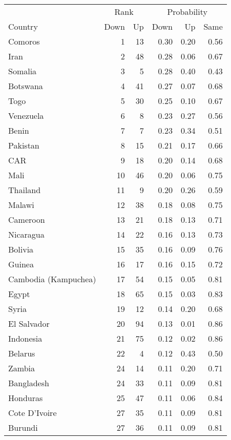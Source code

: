 
\begin{longtable}[t]{lrrrrr}
\toprule
\multicolumn{1}{c}{ } & \multicolumn{2}{c}{Rank} & \multicolumn{3}{c}{Probability} \\
\cmidrule(l{3pt}r{3pt}){2-3} \cmidrule(l{3pt}r{3pt}){4-6}
Country & Down & Up & Down & Up & Same\\
\midrule
Comoros & 1 & 13 & 0.30 & 0.20 & 0.56\\
Iran & 2 & 48 & 0.28 & 0.06 & 0.67\\
Somalia & 3 & 5 & 0.28 & 0.40 & 0.43\\
Botswana & 4 & 41 & 0.27 & 0.07 & 0.68\\
Togo & 5 & 30 & 0.25 & 0.10 & 0.67\\
\addlinespace
Venezuela & 6 & 8 & 0.23 & 0.27 & 0.56\\
Benin & 7 & 7 & 0.23 & 0.34 & 0.51\\
Pakistan & 8 & 15 & 0.21 & 0.17 & 0.66\\
CAR & 9 & 18 & 0.20 & 0.14 & 0.68\\
Mali & 10 & 46 & 0.20 & 0.06 & 0.75\\
\addlinespace
Thailand & 11 & 9 & 0.20 & 0.26 & 0.59\\
Malawi & 12 & 38 & 0.18 & 0.08 & 0.75\\
Cameroon & 13 & 21 & 0.18 & 0.13 & 0.71\\
Nicaragua & 14 & 22 & 0.16 & 0.13 & 0.73\\
Bolivia & 15 & 35 & 0.16 & 0.09 & 0.76\\
\addlinespace
Guinea & 16 & 17 & 0.16 & 0.15 & 0.72\\
Cambodia (Kampuchea) & 17 & 54 & 0.15 & 0.05 & 0.81\\
Egypt & 18 & 65 & 0.15 & 0.03 & 0.83\\
Syria & 19 & 12 & 0.14 & 0.20 & 0.68\\
El Salvador & 20 & 94 & 0.13 & 0.01 & 0.86\\
\addlinespace
Indonesia & 21 & 75 & 0.12 & 0.02 & 0.86\\
Belarus & 22 & 4 & 0.12 & 0.43 & 0.50\\
Zambia & 24 & 14 & 0.11 & 0.20 & 0.71\\
Bangladesh & 24 & 33 & 0.11 & 0.09 & 0.81\\
Honduras & 25 & 47 & 0.11 & 0.06 & 0.84\\
\addlinespace
Cote D'Ivoire & 27 & 35 & 0.11 & 0.09 & 0.81\\
Burundi & 27 & 36 & 0.11 & 0.09 & 0.81\\

\end{longtable}
